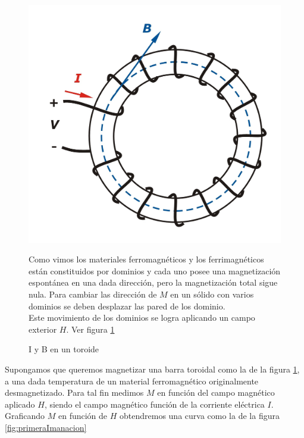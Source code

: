 \begin{figure}[H]

\begin{minipage}[b]{0.45\linewidth}
	\raggedright
    \includegraphics[width=1.0\textwidth]{./Figures/toroide}
    \caption{I y B en un toroide}
    \label{fig:toroide}
\end{minipage}
\begin{minipage}[b]{0.50\textwidth}
	\vspace{0pt}
	Como vimos los materiales ferromagnéticos y los ferrimagnéticos están constituidos por dominios y cada uno posee una magnetización espontánea en una dada dirección, pero la magnetización total sigue nula. Para cambiar las dirección de $M$ en un sólido con varios dominios se deben desplazar las pared de los dominio.\\
	
Este movimiento de los dominios se logra aplicando un campo exterior $H$. Ver figura \ref{fig:toroide}

\vspace{1.0cm}

\end{minipage}

\end{figure}

Supongamos que queremos magnetizar una barra toroidal como la de la figura \ref{fig:toroide}, a una dada temperatura de un material ferromagnético originalmente desmagnetizado. Para tal fin medimos $M$ en función del campo magnético aplicado $H$, siendo el campo magnético función de la corriente eléctrica $I$. Graficando $M$ en función de $H$ obtendremos una curva como la de la figura \ref{fig:primeraImanacion}


